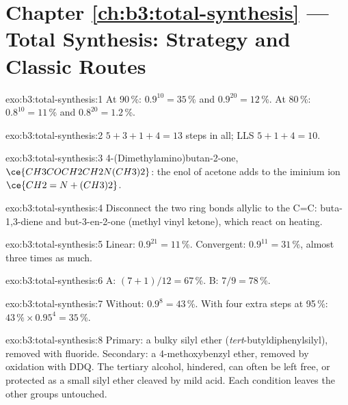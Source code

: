 \section*{Chapter \ref{ch:b3:total-synthesis} --- Total Synthesis: Strategy and Classic Routes}

\begin{solution}{exo:b3:total-synthesis:1}
At 90\,\%: $0.9^{10} = 35$\,\% and $0.9^{20} = 12$\,\%. At 80\,\%: $0.8^{10} = 11$\,\% and $0.8^{20} = 1.2$\,\%.
\end{solution}

\begin{solution}{exo:b3:total-synthesis:2}
$5 + 3 + 1 + 4 = 13$ steps in all; LLS $5 + 1 + 4 = 10$.
\end{solution}

\begin{solution}{exo:b3:total-synthesis:3}
4-(Dimethylamino)butan-2-one, $\ce{CH3COCH2CH2N(CH3)2}$: the enol of acetone adds to the iminium
ion $\ce{CH2=N+(CH3)2}$.
\end{solution}

\begin{solution}{exo:b3:total-synthesis:4}
Disconnect the two ring bonds allylic to the C=C: buta-1,3-diene and but-3-en-2-one
(methyl vinyl ketone), which react on heating.
\end{solution}

\begin{solution}{exo:b3:total-synthesis:5}
Linear: $0.9^{21} = 11$\,\%. Convergent: $0.9^{11} = 31$\,\%, almost three times as much.
\end{solution}

\begin{solution}{exo:b3:total-synthesis:6}
A: $(7 + 1)/12 = 67$\,\%. B: $7/9 = 78$\,\%.
\end{solution}

\begin{solution}{exo:b3:total-synthesis:7}
Without: $0.9^8 = 43$\,\%. With four extra steps at 95\,\%: $43\,\% \times 0.95^4 = 35$\,\%.
\end{solution}

\begin{solution}{exo:b3:total-synthesis:8}
Primary: a bulky silyl ether (\textit{tert}-butyldiphenylsilyl), removed with fluoride.
Secondary: a 4-methoxybenzyl ether, removed by oxidation with DDQ. The tertiary
alcohol, hindered, can often be left free, or protected as a small silyl ether
cleaved by mild acid. Each condition leaves the other groups untouched.
\end{solution}

